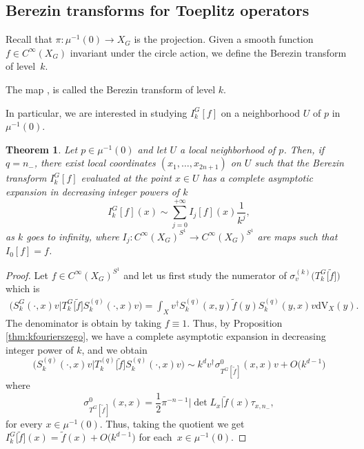 \documentclass[pdftex]{sigma}
\numberwithin{equation}{section}
\newtheorem{Theorem}{Theorem}[section]
\newcommand{\abs}[1]{\left\vert#1\right\vert}
\begin{document}
 \subsection{Berezin transforms for Toeplitz operators}
	
	Recall that $\pi\colon \mu^{-1}(0)\rightarrow X_G$ is the projection. Given a smooth function $f\in C^{\infty}(X_G)$ invariant under the circle action, we define the Berezin transform of level~$k$.
	
 \begin{Definition} The map
, 
 		is called the Berezin transform of level $k$.
\end{Definition}

In particular, we are interested in studying $I_k^G[f]$ on a neighborhood $U$ of $p$ in $\mu^{-1}(0)$.
 	
 	\begin{Theorem} \label{thm:main}
 		Let $p\in \mu^{-1}(0)$ and let $U$ a local neighborhood of $p$. Then, if $q= n_-$, there exist local coordinates $(x_1,\dots, x_{2n+1})$ on $U$ such that the Berezin transform $I^{G}_k[f]$ evaluated at the point $x\in U$ has a complete asymptotic expansion in decreasing integer powers of $k$
 		\[I^G_k[f](x)\sim \sum_{j=0}^{+\infty}I_j[f](x) \frac{1}{k^j} , \]
 		as $k$ goes to infinity, where $I_j \colon C^{\infty}(X_G)^{S^1}\rightarrow C^{\infty}(X_G)^{S^1}$ are maps such that $I_0[f]=f$.
 	\end{Theorem}
 		\begin{proof}
 		Let $f\in C^{\infty}(X_G)^{S^1}$ and let us first study the numerator of $\sigma^{(k)}_v\bigl(T^{G}_{k}\big[\widetilde{f}\big]\bigr)$ which is
 		\begin{align*} \bigl(S^{G}_k(\cdot, x) v\big\vert T^{G}_{k}\big[\widetilde{f}\big] S^{(q)}_k(\cdot, x) v\bigr) =\int_X v^{\dagger} S^{(q)}_k(x, y) \widetilde{f}(y) S^{(q)}_k(y, x) v \mathrm{dV}_X(y) .
 		\end{align*}
 		The denominator is obtain by taking $f\equiv 1$. Thus, by Proposition \ref{thm:kfourierszego}, we have a complete asymptotic expansion in decreasing integer power of $k$, and we obtain
 		\[\bigl(S^{(q)}_k(\cdot, x) v\big \vert T^{(q)}_{k}\big[\widetilde{f}\big] S^{(q)}_k(\cdot, x) v\bigr) \sim k^d v^{\dagger}\sigma^{0}_{T^G [\widetilde{f} ]}(x, x) v +O\bigl(k^{d-1}\bigr)\]
 		where
 		\[\sigma^0_{T^G [\widetilde{f} ]}(x,x)=\frac{1}{2}\pi^{-n-1}\abs{\det L_x} \widetilde{f}(x) \tau_{x,n_-} ,\]
 		for every $x\in \mu^{-1}(0)$. Thus, taking the quotient we get
 		$I_k^G\big[\widetilde{f}\big](x)=\widetilde{f}(x)+O\bigl(k^{d-1}\bigr) $
 		for each~${x\in \mu^{-1}(0)}$.
 	\end{proof}
 	
\end{document}
